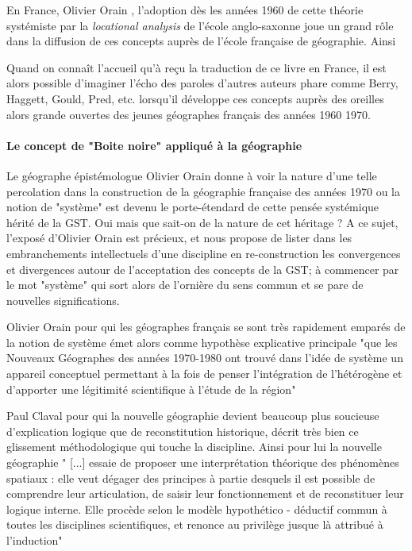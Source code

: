 {En France, Olivier Orain \autocite[26]{Orain2001}, l’adoption dès les années 1960 de cette théorie systémiste par la \textit{locational analysis} de l'école anglo-saxonne joue un grand rôle dans la diffusion de ces concepts auprès de l'école française de géographie. Ainsi 

Quand on connaît l'accueil qu'à reçu la traduction de ce livre en France, il est alors possible d'imaginer l'écho des paroles d'autres auteurs phare comme Berry, Haggett, Gould, Pred, etc. lorsqu'il développe ces concepts auprès des oreilles alors grande ouvertes des jeunes géographes français des années 1960 1970. \autocite[26]{Orain2001}

\paragraph{Le concept de "Boite noire" appliqué à la géographie}

Le géographe épistémologue Olivier Orain \autocite{Orain2001} donne à voir la nature d'une telle percolation dans la construction de la géographie française des années 1970 ou la notion de "système" est devenu le porte-étendard de cette pensée systémique hérité de la GST. Oui mais que sait-on de la nature de cet héritage ? A ce sujet, l'exposé d'Olivier Orain est précieux, et nous propose de lister dans les embranchements intellectuels d'une discipline en re-construction les convergences et divergences autour de l'acceptation des concepts de la GST; à commencer par le mot "système" qui sort alors de l'ornière du sens commun et se pare de nouvelles significations.

Olivier Orain pour qui les géographes français se sont très rapidement emparés de la notion de système émet alors comme hypothèse explicative principale "que les Nouveaux Géographes des années 1970-1980 ont trouvé dans l’idée de système un appareil conceptuel permettant à la fois de penser l’intégration de l’hétérogène et d’apporter une légitimité scientifique à l’étude de la région" \autocite[23]{Orain2001}

\autocite{Batty1976} Paul Claval pour qui la nouvelle géographie devient beaucoup plus soucieuse d'explication logique que de reconstitution historique, décrit très bien ce glissement méthodologique qui touche la discipline. Ainsi pour lui la nouvelle géographie " [...] essaie de proposer une interprétation théorique des phénomènes spatiaux : elle veut dégager des principes à partie desquels il est possible de comprendre leur articulation, de saisir leur fonctionnement et de reconstituer leur logique interne. Elle procède selon le modèle hypothético - déductif commun à toutes les disciplines scientifiques, et renonce au privilège jusque là attribué à l'induction" \autocite[p22]{Claval1977}

}

